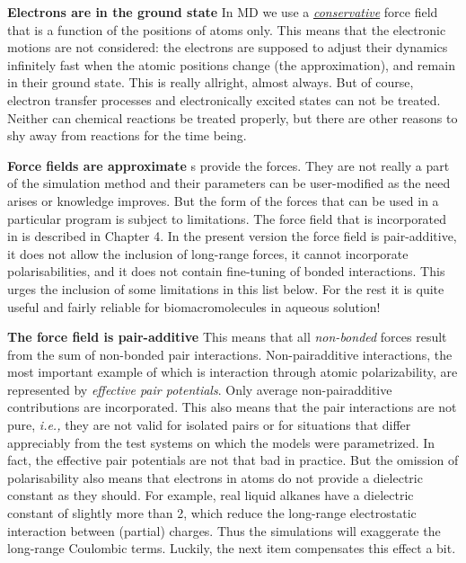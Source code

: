 {\bf Electrons are in the ground state}    
In MD we use a {\em \underline {conservative}} force field that is a
function of the positions of atoms only.  This means that the
electronic motions are not considered: the electrons are supposed to
adjust their dynamics infinitely fast when the atomic positions change
(the {\em {}} approximation), and remain in their ground
state. This is really allright, almost always. But of course, electron
transfer processes and electronically excited states can not be
treated. Neither can chemical reactions be treated properly, but there
are other reasons to shy away from reactions for the time being.    

{\bf Force fields are approximate}
s provide the forces. They are not really a part of the
simulation method and their parameters can be user-modified as the
need arises or knowledge improves. But the form of the forces that can
be used in a particular program is subject to limitations. The force
field that is incorporated in {\gromacs} is described in Chapter 4. In
the present version the force field is pair-additive, it does not
allow the inclusion of long-range forces, it cannot incorporate
polarisabilities, and it does not contain fine-tuning of bonded
interactions. This urges the inclusion of some limitations in this
list below.  For the rest it is quite useful and fairly reliable for
biomacromolecules in aqueous solution!

{\bf The force field is pair-additive} 
This means that all {\em non-bonded} forces result from the sum of
non-bonded pair interactions. Non-pairadditive  interactions, the most
important example of which is interaction through atomic
polarizability, are represented by {\em effective pair
potentials}. Only average non-pairadditive contributions are
incorporated. This also means that the pair interactions are not pure,
{\em i.e.,} they are not valid for isolated pairs or for situations
that differ appreciably from the test systems on which the models were
parametrized. In fact, the effective pair potentials are not that bad
in practice. But the omission of polarisability also means that
electrons in atoms do not provide a dielectric constant as they
should. For example, real liquid alkanes have a dielectric constant of
slightly more than 2, which reduce the long-range electrostatic
interaction between (partial) charges. Thus the simulations will
exaggerate the long-range Coulombic terms. Luckily, the next item
compensates this effect a bit. 

